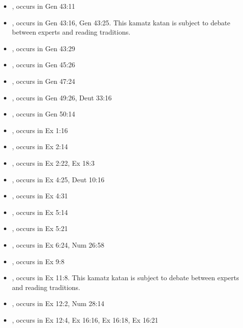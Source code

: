 \documentclass[14pt]{article}
\begin{document}
\begin{itemize}
\item {}, occurs in Gen 43:11

\item {}, occurs in Gen 43:16, Gen 43:25. This kamatz katan is subject to debate between experts and reading traditions.

\item {}, occurs in Gen 43:29

\item {}, occurs in Gen 45:26

\item {}, occurs in Gen 47:24

\item {}, occurs in Gen 49:26, Deut 33:16

\item {}, occurs in Gen 50:14

\item {}, occurs in Ex 1:16

\item {}, occurs in Ex 2:14

\item {}, occurs in Ex 2:22, Ex 18:3

\item {}, occurs in Ex 4:25, Deut 10:16

\item {}, occurs in Ex 4:31

\item {}, occurs in Ex 5:14

\item {}, occurs in Ex 5:21

\item {}, occurs in Ex 6:24, Num 26:58

\item {}, occurs in Ex 9:8

\item {}, occurs in Ex 11:8. This kamatz katan is subject to debate between experts and reading traditions.

\item {}, occurs in Ex 12:2, Num 28:14

\item {}, occurs in Ex 12:4, Ex 16:16, Ex 16:18, Ex 16:21


\end{itemize}
\end{document}
